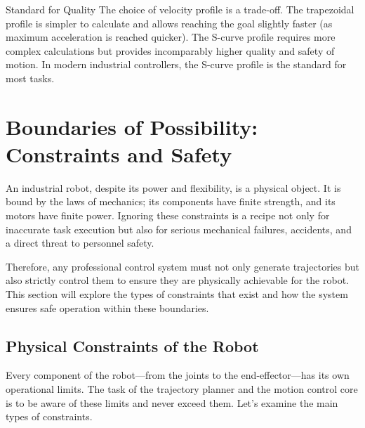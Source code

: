 \begin{tipbox}{Standard for Quality}
The choice of velocity profile is a trade-off. The trapezoidal profile is simpler to calculate and allows reaching the goal slightly faster (as maximum acceleration is reached quicker). The S-curve profile requires more complex calculations but provides incomparably higher quality and safety of motion. In modern industrial controllers, the S-curve profile is the standard for most tasks.
\end{tipbox}


\section{Boundaries of Possibility: Constraints and Safety}
\label{sec:constraints_and_safety}

An industrial robot, despite its power and flexibility, is a physical object. It is bound by the laws of mechanics; its components have finite strength, and its motors have finite power. Ignoring these constraints is a recipe not only for inaccurate task execution but also for serious mechanical failures, accidents, and a direct threat to personnel safety.

Therefore, any professional control system must not only generate trajectories but also strictly control them to ensure they are physically achievable for the robot. This section will explore the types of constraints that exist and how the system ensures safe operation within these boundaries.

\subsection{Physical Constraints of the Robot}
\label{sec:physical_constraints}

Every component of the robot—from the joints to the end-effector—has its own operational limits. The task of the trajectory planner and the motion control core is to be aware of these limits and never exceed them. Let's examine the main types of constraints.

